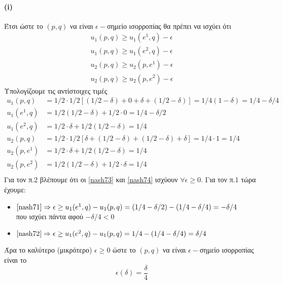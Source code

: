 \documentclass[a4paper,11pt]{article}
\begin{document}
\paragraph{(i)} Έτσι ώστε το $(p,q)$ να είναι $\epsilon-$σημείο ισορροπίας θα πρέπει να ισχύει ότι
\begin{align}
  u_1(p,q) \geq u_1(e^1,q) - \epsilon \label{nash71}\\
  u_1(p,q) \geq u_1(e^2,q) - \epsilon \label{nash72}\\
  u_2(p,q) \geq u_2(p,e^1) - \epsilon \label{nash73}\\
  u_2(p,q) \geq u_2(p,e^2) - \epsilon \label{nash74}
\end{align}
Υπολογίζουμε τις αντίστοιχες τιμές
\begin{align*}
  u_1(p,q) &= 1/2 \cdot 1/2 \left[(1/2-\delta)+0+\delta+(1/2-\delta)\right] = 1/4(1-\delta) = 1/4-\delta/4&\\
  u_1(e^1,q) &= 1/2(1/2-\delta)+1/2 \cdot 0 = 1/4-\delta/2\\
  u_1(e^2,q) &= 1/2 \cdot \delta+1/2(1/2-\delta) = 1/4\\[3pt]
  u_2(p,q) &= 1/2 \cdot 1/2 \left[\delta+(1/2-\delta)+(1/2-\delta)+\delta\right] = 1/4 \cdot 1 = 1/4\\
  u_2(p,e^1) &= 1/2 \cdot \delta+1/2(1/2-\delta) = 1/4\\
  u_2(p,e^2) &= 1/2(1/2-\delta)+1/2 \cdot \delta = 1/4\\
\end{align*}
Για τον π.2 βλέπουμε ότι οι \eqref{nash73} και \eqref{nash74} ισχύουν $\forall \epsilon \geq 0$.
Για τον π.1 τώρα έχουμε:
\begin{itemize}
	\item $\eqref{nash71} \Rightarrow \epsilon \geq u_1(e^1,q)-u_1(p,q) = (1/4-\delta/2) - (1/4-\delta/4) = -\delta/4$\\
	  που ισχύει πάντα αφού $-\delta/4 < 0$
	\item $\eqref{nash72} \Rightarrow \epsilon \geq u_1(e^2,q)-u_1(p,q) = 1/4 - (1/4-\delta/4) = \delta/4$
\end{itemize}
Άρα το καλύτερο (μικρότερο) $\epsilon \geq 0$ ώστε το $(p,q)$ να είναι $\epsilon-$σημείο ισορροπίας είναι το
\[\epsilon(\delta) = \frac{\delta}{4}\]
\end{document}
